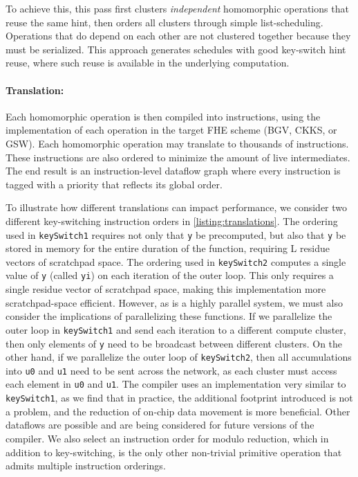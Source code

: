 To achieve this, this pass first clusters \emph{independent} homomorphic operations that reuse the same hint,
then orders all clusters through simple list-scheduling.
Operations that do depend on each other are not clustered together because they must be serialized.
This approach generates schedules with good key-switch hint reuse, where such reuse is available in the underlying computation.

\paragraph{Translation:} Each homomorphic operation is then compiled into instructions,
using the implementation of each operation in the target FHE scheme (BGV, CKKS, or GSW).
Each homomorphic operation may translate to thousands of instructions.
These instructions are also ordered to minimize the amount of live intermediates.
The end result is an instruction-level dataflow graph where every instruction
is tagged with a priority that reflects its global order.

To illustrate how different translations can impact performance, we consider two different key-switching instruction orders in \autoref{listing:translations}. 
The ordering used in \texttt{keySwitch1} requires not only that \texttt{y} be precomputed, but also that \texttt{y} be stored in memory for the entire duration of the function, requiring L residue vectors of scratchpad space. The ordering used in \texttt{keySwitch2} computes a single value of \texttt{y} (called \texttt{yi}) on each iteration of the outer loop. 
This only requires a single residue vector of scratchpad space, making this implementation more scratchpad-space efficient. However, as \name is a highly parallel system, we must also consider the implications of parallelizing these functions. 
If we parallelize the outer loop in \texttt{keySwitch1} and send each iteration to a different compute cluster, then only elements of \texttt{y} need to be broadcast between different clusters. 
On the other hand, if we parallelize the outer loop of \texttt{keySwitch2}, then all accumulations into \texttt{u0} and \texttt{u1} need to be sent across the network, as each cluster must access each element in \texttt{u0} and \texttt{u1}. 
The \name compiler uses an implementation very similar to \texttt{keySwitch1}, as we find that in practice, the additional footprint introduced is not a problem, and the reduction of on-chip data movement is more beneficial. 
Other dataflows are possible and are being considered for future versions of the \name compiler.
We also select an instruction order for modulo reduction, which in addition to key-switching, is the only other non-trivial primitive operation that admits multiple instruction orderings.


